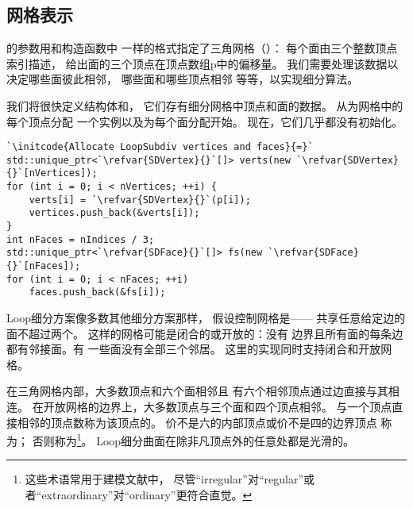 \subsection{网格表示}\label{sub:网格表示}
的参数用和构造函数中
一样的格式指定了三角网格（）：
每个面由三个整数顶点索引描述，
给出面的三个顶点在顶点数组{\ttfamily p}中的偏移量。
我们需要处理该数据以决定哪些面彼此相邻，
哪些面和哪些顶点相邻
等等，以实现细分算法。

我们将很快定义结构体和，
它们存有细分网格中顶点和面的数据。
从为网格中的每个顶点分配
一个实例以及为每个面分配开始。
现在，它们几乎都没有初始化。
\begin{lstlisting}
`\initcode{Allocate LoopSubdiv vertices and faces}{=}`
std::unique_ptr<`\refvar{SDVertex}{}`[]> verts(new `\refvar{SDVertex}{}`[nVertices]);
for (int i = 0; i < nVertices; ++i) {
    verts[i] = `\refvar{SDVertex}{}`(p[i]);
    vertices.push_back(&verts[i]);
}
int nFaces = nIndices / 3;
std::unique_ptr<`\refvar{SDFace}{}`[]> fs(new `\refvar{SDFace}{}`[nFaces]);
for (int i = 0; i < nFaces; ++i)
    faces.push_back(&fs[i]);
\end{lstlisting}

Loop细分方案像多数其他细分方案那样，
假设控制网格是——
共享任意给定边的面不超过两个。
这样的网格可能是闭合的或开放的：没有
边界且所有面的每条边都有邻接面。有
一些面没有全部三个邻居。
这里的实现同时支持闭合和开放网格。

在三角网格内部，大多数顶点和六个面相邻且
有六个相邻顶点通过边直接与其相连。
在开放网格的边界上，大多数顶点与三个面和四个顶点相邻。
与一个顶点直接相邻的顶点数称为该顶点的。
价不是六的内部顶点或价不是四的边界顶点
称为；
否则称为\footnote{这些术语常用于建模文献中，
    尽管“irregular”对“regular”或者“extraordinary”对“ordinary”更符合直觉。}。
Loop细分曲面在除非凡顶点外的任意处都是光滑的。

